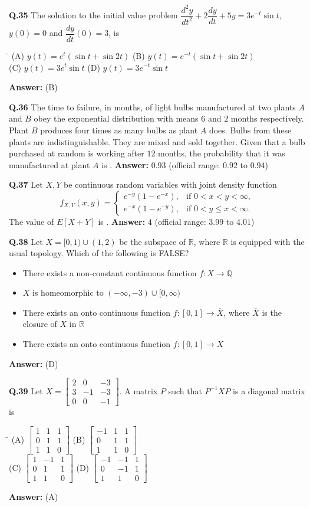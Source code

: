 \documentclass[11pt,a4paper]{article}
\newcommand{\optsfourA}[4]{%
  \begin{tabbing}
    \hspace{0.48\linewidth}\=\kill
    (A) #1 \> (B) #2 \\[2pt]
    (C) #3 \> (D) #4
  \end{tabbing}%
}
\newcommand{\optslistA}[4]{%
  \begin{itemize}
    \setlength{\itemsep}{2pt}\setlength{\parskip}{0pt}
    \item[(A)] #1
    \item[(B)] #2
    \item[(C)] #3
    \item[(D)] #4
  \end{itemize}%
}
\newcommand{\ans}[1]{\textbf{Answer:} #1\par\medskip}
\begin{document}
\textbf{Q.35} The solution to the initial value problem $\dfrac{d^2 y}{dt^2} + 2\dfrac{dy}{dt} + 5y = 3e^{-t}\sin t$, $y(0) = 0$ and $\dfrac{dy}{dt}(0) = 3$, is
\optsfourA{$y(t) = e^t(\sin t + \sin 2t)$}{$y(t) = e^{-t}(\sin t + \sin 2t)$}{$y(t) = 3e^t\sin t$}{$y(t) = 3e^{-t}\sin t$}
\ans{(B)}

\textbf{Q.36} The time to failure, in months, of light bulbs manufactured at two plants $A$ and $B$ obey the exponential distribution with means $6$ and $2$ months respectively. Plant $B$ produces four times as many bulbs as plant $A$ does. Bulbs from these plants are indistinguishable. They are mixed and sold together. Given that a bulb purchased at random is working after $12$ months, the probability that it was manufactured at plant $A$ is \underline{\hspace{2cm}}.
\ans{$0.93$ (official range: $0.92$ to $0.94$)}

\textbf{Q.37} Let $X, Y$ be continuous random variables with joint density function
\[
  f_{X,Y}(x, y) = \begin{cases} e^{-y}(1 - e^{-x}), & \text{if } 0 < x < y < \infty, \\ e^{-x}(1 - e^{-y}), & \text{if } 0 < y \le x < \infty. \end{cases}
\]
The value of $E[X + Y]$ is \underline{\hspace{2cm}}.
\ans{$4$ (official range: $3.99$ to $4.01$)}

\textbf{Q.38} Let $X = [0, 1) \cup (1, 2)$ be the subspace of $\mathbb{R}$, where $\mathbb{R}$ is equipped with the usual topology. Which of the following is FALSE?
\optslistA{There exists a non-constant continuous function $f : X \to \mathbb{Q}$}{$X$ is homeomorphic to $(-\infty, -3) \cup [0, \infty)$}{There exists an onto continuous function $f : [0, 1] \to \overline{X}$, where $\overline{X}$ is the closure of $X$ in $\mathbb{R}$}{There exists an onto continuous function $f : [0, 1] \to X$}
\ans{(D)}

\textbf{Q.39} Let $X = \begin{bmatrix} 2 & 0 & -3 \\ 3 & -1 & -3 \\ 0 & 0 & -1 \end{bmatrix}$. A matrix $P$ such that $P^{-1} X P$ is a diagonal matrix is
\optsfourA{$\begin{bmatrix} 1 & 1 & 1 \\ 0 & 1 & 1 \\ 1 & 1 & 0 \end{bmatrix}$}{$\begin{bmatrix} -1 & 1 & 1 \\ 0 & 1 & 1 \\ 1 & 1 & 0 \end{bmatrix}$}{$\begin{bmatrix} 1 & -1 & 1 \\ 0 & 1 & 1 \\ 1 & 1 & 0 \end{bmatrix}$}{$\begin{bmatrix} -1 & -1 & 1 \\ 0 & -1 & 1 \\ 1 & 1 & 0 \end{bmatrix}$}
\ans{(A)}
\end{document}
